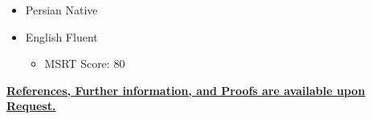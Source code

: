 \documentclass[11pt,a4paper,sans]{moderncv} %
\begin{document}
	\begin{itemize}
	\item Persian \hspace{5 pt} Native
	\item English \hspace{6 pt} Fluent   
		\begin{itemize}
			 \item MSRT Score: 80
		\end{itemize}
	\end{itemize} 
	\vspace{2em}
	\centerline{\underline{\textbf{	\faExclamationCircle \hspace{0.5 pt}  \href{mailto:mjahmadee@gmail.com}{References, Further information, and Proofs are available upon Request.} }}}
\end{document}
